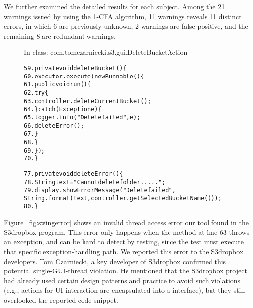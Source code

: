 We further examined the detailed results for each subject.
Among the 21 warnings issued by using the 1-CFA algorithm, 11
warnings reveals 11 distinct errors, in which 6 are previously-unknown,
2 warnings are false positive, and the remaining 8 
are redundant warnings.




\begin{figure}[t]
\hspace{4mm}\small{In class: com.tomczarniecki.s3.gui.DeleteBucketAction}
\vspace{-2mm}
\begin{CodeOut}
\begin{alltt}
59.private void deleteBucket() \{
60.    executor.execute(new Runnable() \{
61.        public void run() \{
62.            try \{
63.                controller.deleteCurrentBucket();
64.            \} catch (Exception e) \{
65.                logger.info("Delete failed", e);
66.                deleteError(); 
67.            \}
68.       \}
69.    \});
70.\}

77.private void deleteError() \{
78.    String text = "Cannot delete folder .....";
79.    display.showErrorMessage("Delete failed", 
        String.format(text, controller.getSelectedBucketName())); 
80.\}
\end{alltt}
\end{CodeOut}
\vspace*{-2.0ex}  %
\end{figure}

Figure~\ref{fig:swingerror}
shows an invalid thread access error our tool found in the S3dropbox
program. This error only happens when the 
method at line 63 throws an exception, and can be hard to
detect by testing, since the test must  execute that specific exception-handling
path. We reported this error to the S3dropbox developers. Tom Czarniecki,
a key developer of S3dropbox confirmed this potential single-GUI-thread
violation. He mentioned that the S3dropbox project had already
used certain design patterns and practice to avoid such violations (e.g.,
actions for UI interaction are encapsulated into a  interface),
but they still overlooked  the reported code snippet. 

